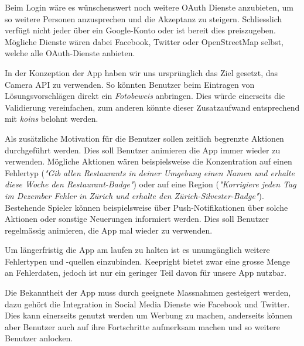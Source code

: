 Beim Login wäre es wünschenswert noch weitere \gls{OAuth} Dienste anzubieten, um so weitere Personen anzusprechen und die Akzeptanz zu steigern.
Schliesslich verfügt nicht jeder über ein Google-Konto oder ist bereit dies preiszugeben.
Mögliche Dienste wären dabei Facebook, Twitter oder OpenStreetMap selbst, welche alle \gls{OAuth}-Dienste anbieten.

In der Konzeption der App haben wir uns ursprünglich das Ziel gesetzt, das \gls{Camera API} zu verwenden. 
So könnten Benutzer beim Eintragen von Lösungsvorschlägen direkt ein \emph{Fotobeweis} anbringen. 
Dies würde einerseits die Validierung vereinfachen, zum anderen könnte dieser Zusatzaufwand entsprechend mit \emph{koins} belohnt werden.

Als zusätzliche Motivation für die Benutzer sollen zeitlich begrenzte Aktionen durchgeführt werden.
Dies soll Benutzer animieren die App immer wieder zu verwenden. 
Mögliche Aktionen wären beispielsweise die Konzentration auf einen Fehlertyp (\emph{"Gib allen Restaurants in deiner Umgebung einen Namen und erhalte diese Woche den Restaurant-Badge"}) oder auf eine Region (\emph{"Korrigiere jeden Tag im Dezember Fehler in Zürich und erhalte den Zürich-Silvester-Badge"}).
Bestehende Spieler können beispielsweise über Push-Notifikationen über solche Aktionen oder sonstige Neuerungen informiert werden. Dies soll Benutzer regelmässig animieren, die App mal wieder zu verwenden.

Um längerfristig die App am laufen zu halten ist es unumgänglich weitere Fehlertypen und -quellen einzubinden. 
Keepright bietet zwar eine grosse Menge an Fehlerdaten, jedoch ist nur ein geringer Teil davon für unsere App nutzbar.

Die Bekanntheit der App muss durch geeignete Massnahmen gesteigert werden, dazu gehört die Integration in Social Media Dienste wie Facebook und Twitter. Dies kann einerseits genutzt werden um Werbung zu machen, anderseits können aber Benutzer auch auf ihre Fortschritte aufmerksam machen und so weitere Benutzer anlocken.